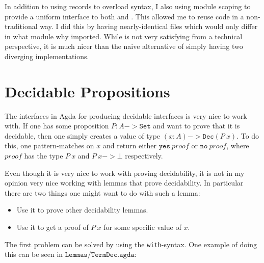 In addition to using records to overload syntax, I also using module scoping to
provide a uniform interface to both \ATAL and \ATALe. This allowed me to reuse
code in a non-traditional way. I did this by having nearly-identical files which
would only differ in what module why imported. While is not very satisfying from
a technical perspective, it is much nicer than the naive alternative of simply
having two diverging implementations.

\section{Decidable Propositions}

The interfaces in Agda for producing decidable interfaces is very nice to work
with. If one has some proposition $P : A -> \mathtt{Set}$ and want to prove that
it is decidable, then one simply creates a value of type
$(x : A) -> \mathtt{Dec} (P\ x)$. To do this, one pattern-matches on $x$ and
return either $\mathtt{yes}\ proof$ or $\mathtt{no}\ proof$, where $proof$ has
the type $P\ x$ and $P\ x -> \bot$ respectively.

Even though it is very nice to work with proving decidability, it is not in my
opinion very nice working with lemmas that prove decidability. In particular
there are two things one might want to do with such a lemma:

\begin{itemize}
\item Use it to prove other decidability lemmas.
\item Use it to get a proof of $P\ x$ for some specific value of $x$.
\end{itemize}

The first problem can be solved by using the \texttt{with}-syntax. One example
of doing this can be seen in $\texttt{Lemmas/TermDec.agda}$:

